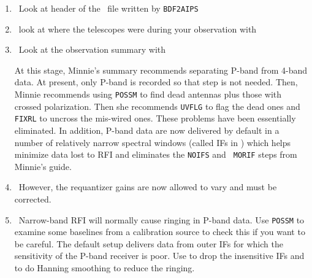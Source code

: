 \begin{enumerate}
\item\ Look at header of the \AIPS\ file written by {\tt BDF2AIPS}

\item\ look at where the telescopes were during your observation with
     {\tt {}}

\item\ Look at the observation summary with {\tt {}}

At this stage, Minnie's summary recommends separating P-band from
4-band data.  At present, only P-band is recorded so that step is not
needed.  Then, Minnie recommends using {\tt POSSM} to find dead
antennas plus those with crossed polarization.  Then she recommends
{\tt UVFLG} to flag the dead ones and {\tt FIXRL} to uncross the
mis-wired ones.  These problems have been essentially eliminated.
In addition, P-band data are now delivered by default in a number of
relatively narrow spectral windows (called IFs in \AIPS) which helps
minimize data lost to RFI and eliminates the {\tt NOIFS} and {\tt
  MORIF} steps from Minnie's guide.

\item\ However, the requantizer gains are now allowed to vary and must
  be corrected.

\item\ Narrow-band RFI will normally cause ringing in P-band data.
  Use {\tt POSSM} to examine some baselines from a calibration source
  to check this if you want to be careful.  The default setup delivers
  data from outer IFs for which the sensitivity of the P-band receiver
  is poor.  Use  to drop the insensitive IFs and to do
  Hanning smoothing to reduce the ringing.
\vfill\eject
{}


\end{enumerate}
